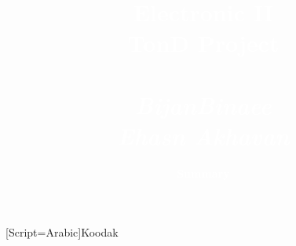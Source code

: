 

\newcommand{\confTitle}{Electronic II} %
\newcommand{\hmwkDueDate}{TonD Project} %
\newcommand{\Places}{by Bijan Binaee} %
\newcommand{\confCompany}{Summary} %



\title{
\vspace{3.5in}
\textcolor{white}{\textmd{\fontsize{40}{40}\textbf{\confTitle}}\\
\vspace{3.75in}
\small{\hmwkDueDate}\\~\\
\large{\textit{\hspace{-10pt}Bijan\hspace{8pt}Binaee}}\\
\vspace{-0.1in}
\large{\textit{Ehasn Akhavan}}
}
}

\author{\textcolor{white}{\textbf{\confCompany}}}
\date{} %


\newfontfamily{\arabicfont}[Script=Arabic]{Koodak}

